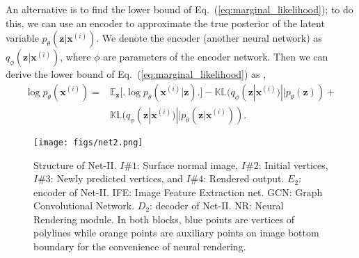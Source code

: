 \documentclass[letterpaper, 10 pt, journal, twoside]{ieeetran}
\begin{document}
An alternative  is to find the lower bound of Eq.~(\ref{eq:marginal_likelihood}); to do this,  
we can use an encoder to approximate the true posterior of the latent variable $p_{\theta}(\mathbf{z}|\mathbf{x}^{(i)})$. We denote the encoder (another neural network) as $q_{\phi}(\mathbf{z}|\mathbf{x}^{(i)})$, where $\phi$ are parameters of the encoder network. Then we can derive the lower bound of Eq.~(\ref{eq:marginal_likelihood}) as \cite{kingma2013auto},
\begin{equation}
    \label{eq:elbo}
    \begin{aligned}
        \log p_{\theta}(\mathbf{x}^{(i)}) = &\mathbb{E}_{\mathbf{z}} \Bigg[ \Bigg.
        \log p_{\theta} (\mathbf{x}^{(i)}|\mathbf{z}) \Bigg. \Bigg] - \mathbb{KL}(q_{\phi}(\mathbf{z}|\mathbf{x}^{(i)}) || p_{\theta}(\mathbf{z}))+ \\
        &\mathbb{KL}(q_{\phi}(\mathbf{z}|\mathbf{x}^{(i)}) || p_{\theta}(\mathbf{z}|\mathbf{x}^{(i)})).
    \end{aligned}
\end{equation}

\begin{figure} \vspace{7pt}
\centering
  {\texttt{[image: figs/net2.png]}}
\caption{\small Structure of Net-II. $I\#1$: Surface normal image, $I\#2$: Initial vertices, $I\#3$: Newly predicted vertices, and $I\#4$: Rendered output. $E_2$: encoder of Net-II. IFE: Image Feature Extraction net. GCN: Graph Convolutional Network. $D_2$: decoder of Net-II. NR: Neural Rendering module. In both blocks, blue points are vertices of polylines while  orange points are auxiliary points on image bottom boundary for the convenience of neural rendering. \vspace{-15pt} 
} 
\label{fig:net2}  
\end{figure}
\end{document}
